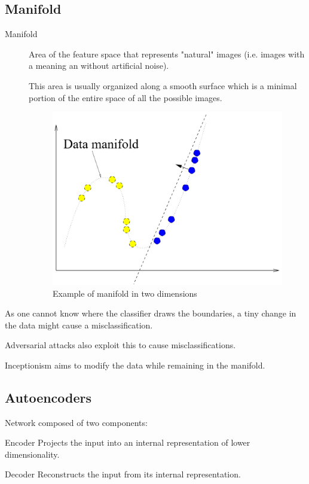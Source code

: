 \subsection{Manifold}

\begin{description}
    \item[Manifold] 
        Area of the feature space that represents "natural" images (i.e. images with a meaning an without artificial noise).

        This area is usually organized along a smooth surface which is a minimal portion of the entire space of all the possible images.

        \begin{figure}[H]
            \centering
            \includegraphics[width=0.35\linewidth]{./img/manifold.png}
            \caption{Example of manifold in two dimensions}
        \end{figure}
\end{description}

\begin{remark}
    As one cannot know where the classifier draws the boundaries,
    a tiny change in the data might cause a misclassification.

    Adversarial attacks also exploit this to cause misclassifications.
\end{remark}

\begin{remark}
    Inceptionism aims to modify the data while remaining in the manifold.
\end{remark}


\subsection{Autoencoders}

Network composed of two components:
\begin{descriptionlist}
    \item[Encoder]
        Projects the input into an internal representation of lower dimensionality.

    \item[Decoder]
        Reconstructs the input from its internal representation.
\end{descriptionlist}

